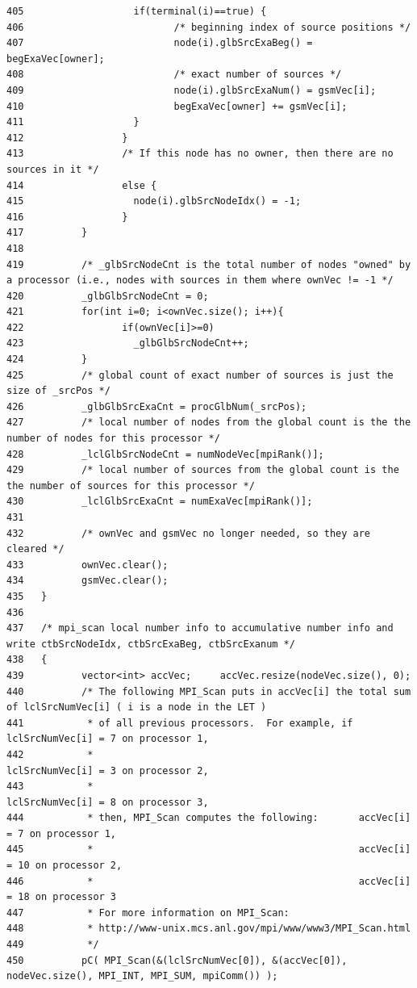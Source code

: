 \begin{verbatim}
405                   if(terminal(i)==true) {
406                          /* beginning index of source positions */
407                          node(i).glbSrcExaBeg() = begExaVec[owner];
408                          /* exact number of sources */
409                          node(i).glbSrcExaNum() = gsmVec[i]; 
410                          begExaVec[owner] += gsmVec[i];
411                   }     
412                 }
413                 /* If this node has no owner, then there are no sources in it */
414                 else { 
415                   node(i).glbSrcNodeIdx() = -1; 
416                 }
417          }
418 
419          /* _glbSrcNodeCnt is the total number of nodes "owned" by a processor (i.e., nodes with sources in them where ownVec != -1 */
420          _glbGlbSrcNodeCnt = 0;
421          for(int i=0; i<ownVec.size(); i++){
422                 if(ownVec[i]>=0)
423                   _glbGlbSrcNodeCnt++;
424          }
425          /* global count of exact number of sources is just the size of _srcPos */
426          _glbGlbSrcExaCnt = procGlbNum(_srcPos);
427          /* local number of nodes from the global count is the the number of nodes for this processor */
428          _lclGlbSrcNodeCnt = numNodeVec[mpiRank()];
429          /* local number of sources from the global count is the the number of sources for this processor */
430          _lclGlbSrcExaCnt = numExaVec[mpiRank()];
431 
432          /* ownVec and gsmVec no longer needed, so they are cleared */
433          ownVec.clear();
434          gsmVec.clear();
435   }
436   
437   /* mpi_scan local number info to accumulative number info and write ctbSrcNodeIdx, ctbSrcExaBeg, ctbSrcExanum */
438   {
439          vector<int> accVec;     accVec.resize(nodeVec.size(), 0);
440          /* The following MPI_Scan puts in accVec[i] the total sum of lclSrcNumVec[i] ( i is a node in the LET )
441           * of all previous processors.  For example, if lclSrcNumVec[i] = 7 on processor 1,
442           *                                              lclSrcNumVec[i] = 3 on processor 2,
443           *                                              lclSrcNumVec[i] = 8 on processor 3,
444           * then, MPI_Scan computes the following:       accVec[i] = 7 on processor 1,
445           *                                              accVec[i] = 10 on processor 2,
446           *                                              accVec[i] = 18 on processor 3
447           * For more information on MPI_Scan:
448           * http://www-unix.mcs.anl.gov/mpi/www/www3/MPI_Scan.html
449           */
450          pC( MPI_Scan(&(lclSrcNumVec[0]), &(accVec[0]), nodeVec.size(), MPI_INT, MPI_SUM, mpiComm()) );

\end{verbatim}
